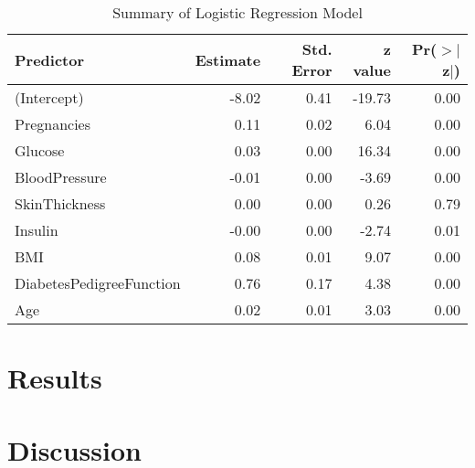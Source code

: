 \documentclass[12pt]{article}
\begin{document}
\begin{table}[ht]
    \caption{Summary of Logistic Regression Model}
    \label{tab:sl}
\centering
\begin{tabular}{lrrrr}
  \hline
Predictor & Estimate & Std. Error & z value & Pr($>$$|$z$|$) \\ 
  \hline
(Intercept) & -8.02 & 0.41 & -19.73 & 0.00 \\ 
  Pregnancies & 0.11 & 0.02 & 6.04 & 0.00 \\ 
  Glucose & 0.03 & 0.00 & 16.34 & 0.00 \\ 
  BloodPressure & -0.01 & 0.00 & -3.69 & 0.00 \\ 
  SkinThickness & 0.00 & 0.00 & 0.26 & 0.79 \\ 
  Insulin & -0.00 & 0.00 & -2.74 & 0.01 \\ 
  BMI & 0.08 & 0.01 & 9.07 & 0.00 \\ 
  DiabetesPedigreeFunction & 0.76 & 0.17 & 4.38 & 0.00 \\ 
  Age & 0.02 & 0.01 & 3.03 & 0.00 \\ 
   \hline
\end{tabular}
\end{table}
\section{Results}
\label{sec:resu}

\section{Discussion}
\label{sec:disc}



\end{document}
